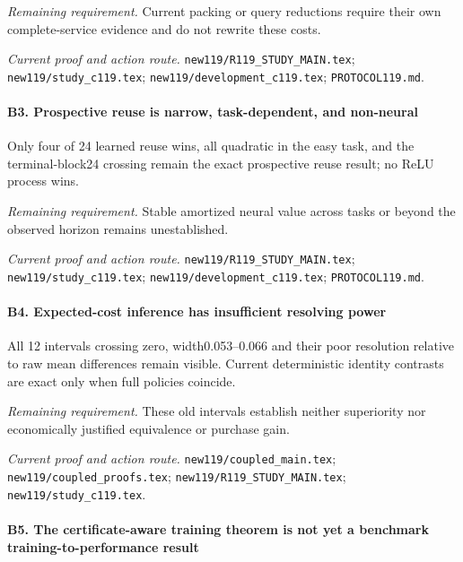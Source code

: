 \par\emph{Remaining requirement.} Current packing or query reductions require their own complete-service evidence and do not rewrite these costs.

\par\emph{Current proof and action route.} \nolinkurl{new119/R119_STUDY_MAIN.tex}; \nolinkurl{new119/study_c119.tex}; \nolinkurl{new119/development_c119.tex}; \nolinkurl{PROTOCOL119.md}.

\paragraph{B3. Prospective reuse is narrow, task-dependent, and non-neural}

Only four of 24 learned reuse wins, all quadratic in the easy task, and the terminal-block24 crossing remain the exact prospective reuse result; no ReLU process wins.

\par\emph{Remaining requirement.} Stable amortized neural value across tasks or beyond the observed horizon remains unestablished.

\par\emph{Current proof and action route.} \nolinkurl{new119/R119_STUDY_MAIN.tex}; \nolinkurl{new119/study_c119.tex}; \nolinkurl{new119/development_c119.tex}; \nolinkurl{PROTOCOL119.md}.

\paragraph{B4. Expected-cost inference has insufficient resolving power}

All 12 intervals crossing zero, width0.053--0.066 and their poor resolution relative to raw mean differences remain visible. Current deterministic identity contrasts are exact only when full policies coincide.

\par\emph{Remaining requirement.} These old intervals establish neither superiority nor economically justified equivalence or purchase gain.

\par\emph{Current proof and action route.} \nolinkurl{new119/coupled_main.tex}; \nolinkurl{new119/coupled_proofs.tex}; \nolinkurl{new119/R119_STUDY_MAIN.tex}; \nolinkurl{new119/study_c119.tex}.

\paragraph{B5. The certificate-aware training theorem is not yet a benchmark training-to-performance result}

